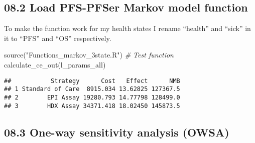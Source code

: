 \documentclass[
]{article}
\newenvironment{Shaded}{\begin{snugshade}}{\end{snugshade}}
\newcommand{\CommentTok}[1]{\textcolor[rgb]{0.56,0.35,0.01}{\textit{#1}}}
\newcommand{\FunctionTok}[1]{\textcolor[rgb]{0.00,0.00,0.00}{#1}}
\newcommand{\NormalTok}[1]{#1}
\newcommand{\StringTok}[1]{\textcolor[rgb]{0.31,0.60,0.02}{#1}}
\begin{document}
\hypertarget{load-pfs-pfser-markov-model-function}{%
\subsection{08.2 Load PFS-PFSer Markov model
function}\label{load-pfs-pfser-markov-model-function}}

To make the function work for my health states I rename ``health'' and
``sick'' in it to ``PFS'' and ``OS'' respectively.

\begin{Shaded}
\begin{Highlighting}[]
\FunctionTok{source}\NormalTok{(}\StringTok{"Functions\_markov\_3state.R"}\NormalTok{)}
\CommentTok{\# Test function}
\FunctionTok{calculate\_ce\_out}\NormalTok{(l\_params\_all)}
\end{Highlighting}
\end{Shaded}

\begin{verbatim}
##           Strategy      Cost   Effect      NMB
## 1 Standard of Care  8915.034 13.62825 127367.5
## 2        EPI Assay 19280.793 14.77798 128499.0
## 3        HDX Assay 34371.418 18.02450 145873.5
\end{verbatim}

\hypertarget{one-way-sensitivity-analysis-owsa}{%
\subsection{08.3 One-way sensitivity analysis
(OWSA)}\label{one-way-sensitivity-analysis-owsa}}
\end{document}
